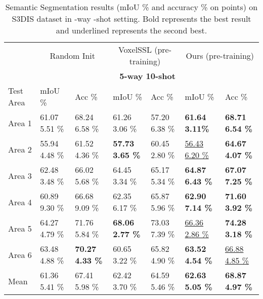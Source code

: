 \documentclass{article}
\begin{document}
\begin{table}[tbp]
	\caption{Semantic Segmentation results (mIoU \% and accuracy \% on points) on S3DIS dataset in -way -shot setting. Bold represents the best result and underlined represents the second best.}
	\label{semantic}
	\centering
	\scriptsize
	\begin{tabular}{lllllll}
		\toprule
		&  \multicolumn{2}{c}{Random Init} & \multicolumn{2}{c}{VoxelSSL (pre-training)} & \multicolumn{2}{c}{Ours (pre-training)}\\
		\cmidrule(r){2-7}
		& \multicolumn{6}{c}{\textbf{5-way 10-shot}}\\
		\cmidrule(r){2-7}
		Test Area & mIoU \% & Acc \% & mIoU \% & Acc \% & mIoU \% & Acc \% \\
		\midrule
		Area 1 & 61.07  5.51 \% & 68.24  6.58  \%& 61.26  3.06 \% & 57.20  6.38  \%& \textbf{61.64  3.11\%} & \textbf{68.71  6.54 \%}\\
		Area 2 & 55.94  4.48 \% & 61.52  4.36  \%& \textbf{57.73  3.65 \%} & 60.45  2.80  \%& \underline{56.43  6.20 \%}& \textbf{64.67  4.07  \%}\\
		Area 3 & 62.48  3.48 \% & 66.02  5.68 \%& 64.45  3.34 \% & 65.17  5.34 \%& \textbf{64.87  6.43 \%}& \textbf{67.07  7.25 \%}\\
		Area 4 & 60.89  9.30 \% & 66.68  9.09 \%& 62.35  6.17 \% & 65.87  5.96  \%& \textbf{62.90  7.14 \%}& \textbf{71.60  3.92 \%}\\
		Area 5 & 64.27  4.79 \% & 71.76  5.84 \%& \textbf{68.06  2.77 \%} & 73.03  7.39  \%& \underline{66.36  2.86 \%}& \textbf{74.28  3.18 \%}\\
		Area 6 & 63.48  4.88 \% & \textbf{70.27  4.33 \%}& 60.65  3.22 \% & 65.82  4.90  \%& \textbf{63.52  4.54 \%}& \underline{66.88  4.85 \%}\\
		Mean & 61.36  5.41 \% & 67.41  5.98 \%& 62.42  3.70 \% & 64.59  5.46 \%& \textbf{62.63  5.05 \%}&  \textbf{68.87  4.97 \%}\\
		\bottomrule
	\end{tabular}
\end{table}
\end{document}
